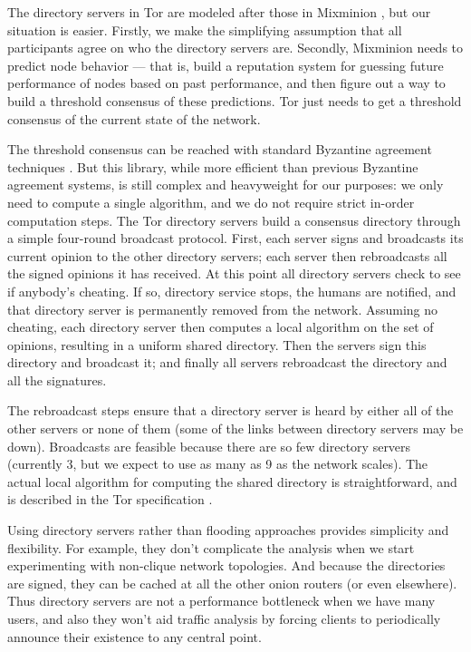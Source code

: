 \documentclass[times,10pt,twocolumn]{article}
\begin{document}
The directory servers in Tor are modeled after those in Mixminion
\cite{minion-design}, but our situation is easier. Firstly, we make the
simplifying assumption that all participants agree on who the directory
servers are. Secondly, Mixminion needs to predict node behavior ---
that is, build a reputation system for guessing future performance of
nodes based on past performance, and then figure out a way to build
a threshold consensus of these predictions. Tor just needs to get a
threshold consensus of the current state of the network.

The threshold consensus can be reached with standard Byzantine agreement
techniques \cite{castro-liskov}.
But this library, while more efficient than previous Byzantine agreement
systems, is still complex and heavyweight for our purposes: we only need
to compute a single algorithm, and we do not require strict in-order
computation steps. The Tor directory servers build a consensus directory
through a simple four-round broadcast protocol. First, each server signs
and broadcasts its current opinion to the other directory servers; each
server then rebroadcasts all the signed opinions it has received. At this
point all directory servers check to see if anybody's cheating. If so,
directory service stops, the humans are notified, and that directory
server is permanently removed from the network. Assuming no cheating,
each directory server then computes a local algorithm on the set of
opinions, resulting in a uniform shared directory. Then the servers sign
this directory and broadcast it; and finally all servers rebroadcast
the directory and all the signatures.

The rebroadcast steps ensure that a directory server is heard by either
all of the other servers or none of them (some of the links between
directory servers may be down). Broadcasts are feasible because there
are so few directory servers (currently 3, but we expect to use as many
as 9 as the network scales). The actual local algorithm for computing
the shared directory is straightforward, and is described in the Tor
specification \cite{tor-spec}.

Using directory servers rather than flooding approaches provides
simplicity and flexibility. For example, they don't complicate
the analysis when we start experimenting with non-clique network
topologies. And because the directories are signed, they can be cached at
all the other onion routers (or even elsewhere). Thus directory servers
are not a performance bottleneck when we have many users, and also they
won't aid traffic analysis by forcing clients to periodically announce
their existence to any central point.
\end{document}

